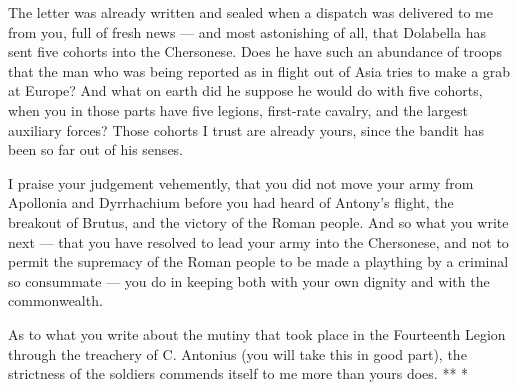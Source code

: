 

 The letter was already written and sealed when a dispatch was delivered to me from you, full of fresh news --- and most astonishing of all, that Dolabella has sent five cohorts into the Chersonese. Does he have such an abundance of troops that the man who was being reported as in flight out of Asia tries to make a grab at Europe? And what on earth did he suppose he would do with five cohorts, when you in those parts have five legions, first-rate cavalry, and the largest auxiliary forces? Those cohorts I trust are already yours, since the bandit has been so far out of his senses.

 I praise your judgement vehemently, that you did not move your army from Apollonia and Dyrrhachium before you had heard of Antony's flight, the breakout of Brutus, and the victory of the Roman people. And so what you write next --- that you have resolved to lead your army into the Chersonese, and not to permit the supremacy of the Roman people to be made a plaything by a criminal so consummate --- you do in keeping both with your own dignity and with the commonwealth.

 As to what you write about the mutiny that took place in the Fourteenth Legion through the treachery of C. Antonius (you will take this in good part), the strictness of the soldiers commends itself to me more than yours does. ** *
